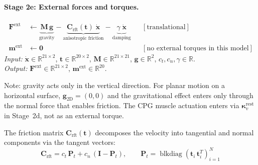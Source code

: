 \documentclass[11pt]{article}
\newcommand{\vect}[1]{\mathbf{#1}}
\newcommand{\mat}[1]{\mathbf{#1}}
\newcommand{\Real}{\mathbb{R}}
\begin{document}
\paragraph{Stage 2e: External forces and torques.}
\begin{equation}
  \boxed{\;
  \begin{aligned}
    \vect{F}^{\text{ext}} &\leftarrow
      \underbrace{\mat{M}\,\vect{g}}_{\text{gravity}}
      - \underbrace{\mat{C}_{\text{rft}}(\vect{t})\;\dot{\vect{x}}}_{\text{anisotropic friction}}
      - \underbrace{\gamma\;\dot{\vect{x}}}_{\text{damping}}
      && [\text{translational}] \\[4pt]
    \vect{m}^{\text{ext}} &\leftarrow \vect{0}
      && [\text{no external torques in this model}]
  \end{aligned}
  \;}
  \label{eq:mat-external}
\end{equation}
\textit{Input:} $\dot{\vect{x}} \in \Real^{21 \times 2}$, $\vect{t} \in \Real^{20 \times 2}$, $\mat{M} \in \Real^{21 \times 21}$, $\vect{g} \in \Real^{2}$, $c_t, c_n, \gamma \in \Real$. \\
\textit{Output:} $\vect{F}^{\text{ext}} \in \Real^{21 \times 2}$, $\vect{m}^{\text{ext}} \in \Real^{20}$.

\noindent
Note: gravity acts only in the vertical direction.
For planar motion on a horizontal surface, $\vect{g}_{\text{2D}} = (0, 0)$ and the gravitational effect enters only through the normal force that enables friction.
The CPG muscle actuation enters via $\bm{\kappa}_v^{\text{rest}}$ in Stage~2d, not as an external torque.

The friction matrix $\mat{C}_{\text{rft}}(\vect{t})$ decomposes the velocity into tangential and normal components via the tangent vectors:
\begin{equation}
  \mat{C}_{\text{rft}} = c_t\,\mat{P}_t + c_n\,(\mat{I} - \mat{P}_t),
  \qquad
  \mat{P}_t = \operatorname{blkdiag}\!\left(\vect{t}_i\,\vect{t}_i^T\right)_{i=1}^{N}
  \label{eq:friction-matrix}
\end{equation}
\end{document}
